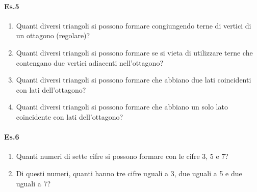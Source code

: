 \paragraph{Es.5}
\begin{enumerate}
    \item Quanti diversi triangoli si possono formare congiungendo terne di vertici di un
ottagono (regolare)?
\item Quanti diversi triangoli si possono formare se si vieta di utilizzare terne che
contengano due vertici adiacenti nell'ottagono?
\item Quanti diversi triangoli si possono formare che abbiano due lati coincidenti con lati
dell'ottagono?
\item Quanti diversi triangoli si possono formare che abbiano un solo lato coincidente
con lati dell'ottagono?
\end{enumerate}

\paragraph{Es.6}
\begin{enumerate}
    \item Quanti numeri di sette cifre si possono formare con le cifre 3, 5 e 7?
\item Di questi numeri, quanti hanno tre cifre uguali a 3, due uguali a 5 e due uguali a 7?
\end{enumerate}




\newpage